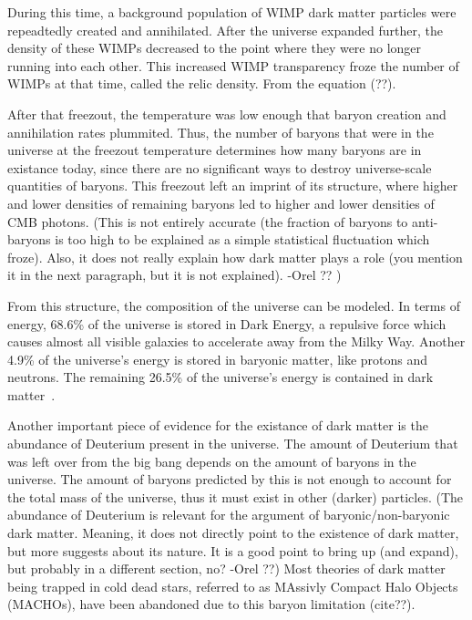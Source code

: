     During this time, a background population of WIMP dark matter particles were repeadtedly created and annihilated.
    After the universe expanded further, the density of these WIMPs decreased to the point where they were no longer running into each other.
    This increased WIMP transparency froze the number of WIMPs at that time, called the relic density.
    From the equation (??).
    
    
    After that freezout, the temperature was low enough that baryon creation and annihilation rates plummited.
    Thus, the number of baryons that were in the universe at the freezout temperature determines how many baryons are in existance today, since there are no significant ways to destroy universe-scale quantities of baryons.
    This freezout left an imprint of its structure, where higher and lower densities of remaining baryons led to higher and lower densities of CMB photons.
    {\color{red}(This is not entirely accurate (the fraction of baryons to anti-baryons is too high to be explained as a simple statistical fluctuation which froze).
Also, it does not really explain how dark matter plays a role (you mention it in the next paragraph, but it is not explained). -Orel ?? )}
    

    From this structure, the composition of the universe can be modeled.
    In terms of energy, 68.6\% of the universe is stored in Dark Energy, a repulsive force which causes almost all visible galaxies to accelerate away from the Milky Way.
    Another 4.9\% of the universe's energy is stored in baryonic matter, like protons and neutrons.
    The remaining 26.5\% of the universe's energy is contained in dark matter~\cite{planck2015}.

    Another important piece of evidence for the existance of dark matter is the abundance of Deuterium present in the universe.
    The amount of Deuterium that was left over from the big bang depends on the amount of baryons in the universe.
    The amount of baryons predicted by this is not enough to account for the total mass of the universe, thus it must exist in other (darker) particles.
    {\color{red}(The abundance of Deuterium is relevant for the argument of baryonic/non-baryonic dark matter. Meaning, it does not directly point to the existence of dark matter, but more suggests about its nature. It is a good point to bring up (and expand), but probably in a different section, no? -Orel ??)}
    Most theories of dark matter being trapped in cold dead stars, referred to as MAssivly Compact Halo Objects (MACHOs), have been abandoned due to this baryon limitation {\color{red}(cite??)}.

